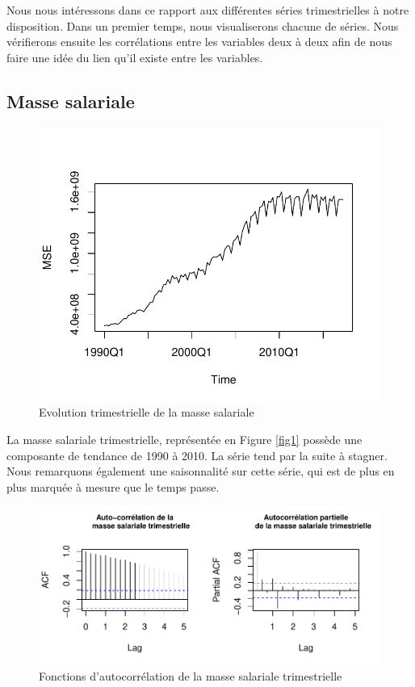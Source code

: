 \documentclass[11pt,]{article}
\begin{document}
Nous nous intéressons dans ce rapport aux différentes séries
trimestrielles à notre disposition. Dans un premier temps, nous
visualiserons chacune de séries. Nous vérifierons ensuite les
corrélations entre les variables deux à deux afin de nous faire une idée
du lien qu'il existe entre les variables.

\subsection{\texorpdfstring{Masse salariale
\label{MSE}}{Masse salariale }}\label{masse-salariale}

\begin{figure}

{\centering \includegraphics{doc_files/figure-latex/unnamed-chunk-1-1} 

}

\caption{\label{fig1} Evolution trimestrielle de la masse salariale}\label{fig:unnamed-chunk-1}
\end{figure}

La masse salariale trimestrielle, représentée en Figure \ref{fig1}
possède une composante de tendance de 1990 à 2010. La série tend par la
suite à stagner. Nous remarquons également une saisonnalité sur cette
série, qui est de plus en plus marquée à mesure que le temps passe.

\begin{figure}[htbp]
\centering
\includegraphics{doc_files/figure-latex/unnamed-chunk-2-1.pdf}
\caption{\label{fig2} Fonctions d'autocorrélation de la masse salariale
trimestrielle}
\end{figure}
\end{document}
